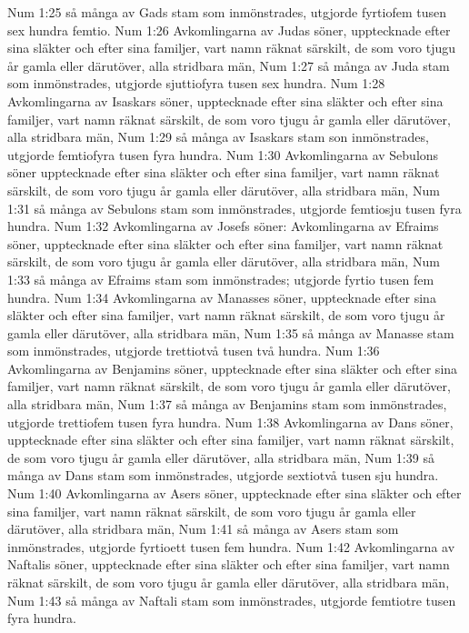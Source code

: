 Num 1:25  så många av Gads stam som inmönstrades, utgjorde fyrtiofem tusen sex hundra femtio.
Num 1:26  Avkomlingarna av Judas söner, upptecknade efter sina släkter och efter sina familjer, vart namn räknat särskilt, de som voro tjugu år gamla eller därutöver, alla stridbara män,
Num 1:27  så många av Juda stam som inmönstrades, utgjorde sjuttiofyra tusen sex hundra.
Num 1:28  Avkomlingarna av Isaskars söner, upptecknade efter sina släkter och efter sina familjer, vart namn räknat särskilt, de som voro tjugu år gamla eller därutöver, alla stridbara män,
Num 1:29  så många av Isaskars stam son inmönstrades, utgjorde femtiofyra tusen fyra hundra.
Num 1:30  Avkomlingarna av Sebulons söner upptecknade efter sina släkter och efter sina familjer, vart namn räknat särskilt, de som voro tjugu år gamla eller därutöver, alla stridbara män,
Num 1:31  så många av Sebulons stam som inmönstrades, utgjorde femtiosju tusen fyra hundra.
Num 1:32  Avkomlingarna av Josefs söner: Avkomlingarna av Efraims söner, upptecknade efter sina släkter och efter sina familjer, vart namn räknat särskilt, de som voro tjugu år gamla eller därutöver, alla stridbara män,
Num 1:33  så många av Efraims stam som inmönstrades; utgjorde fyrtio tusen fem hundra.
Num 1:34  Avkomlingarna av Manasses söner, upptecknade efter sina släkter och efter sina familjer, vart namn räknat särskilt, de som voro tjugu år gamla eller därutöver, alla stridbara män,
Num 1:35  så många av Manasse stam som inmönstrades, utgjorde trettiotvå tusen två hundra.
Num 1:36  Avkomlingarna av Benjamins söner, upptecknade efter sina släkter och efter sina familjer, vart namn räknat särskilt, de som voro tjugu år gamla eller därutöver, alla stridbara män,
Num 1:37  så många av Benjamins stam som inmönstrades, utgjorde trettiofem tusen fyra hundra.
Num 1:38  Avkomlingarna av Dans söner, upptecknade efter sina släkter och efter sina familjer, vart namn räknat särskilt, de som voro tjugu år gamla eller därutöver, alla stridbara män,
Num 1:39  så många av Dans stam som inmönstrades, utgjorde sextiotvå tusen sju hundra.
Num 1:40  Avkomlingarna av Asers söner, upptecknade efter sina släkter och efter sina familjer, vart namn räknat särskilt, de som voro tjugu år gamla eller därutöver, alla stridbara män,
Num 1:41  så många av Asers stam som inmönstrades, utgjorde fyrtioett tusen fem hundra.
Num 1:42  Avkomlingarna av Naftalis söner, upptecknade efter sina släkter och efter sina familjer, vart namn räknat särskilt, de som voro tjugu år gamla eller därutöver, alla stridbara män,
Num 1:43  så många av Naftali stam som inmönstrades, utgjorde femtiotre tusen fyra hundra.
